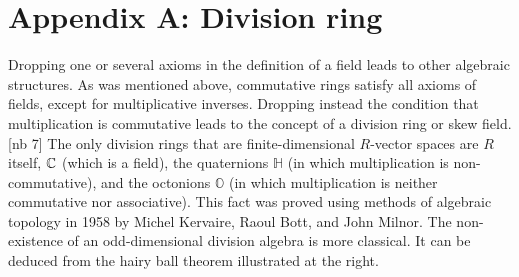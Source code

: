 
\chapter{Appendix A: Division ring}
\label{AppendixA}

Dropping one or several axioms in the definition of a field leads to other algebraic structures. As was mentioned above, commutative rings satisfy all axioms of fields, except for multiplicative inverses. Dropping instead the condition that multiplication is commutative leads to the concept of a division ring or skew field.[nb 7] The only division rings that are finite-dimensional \(R\)-vector spaces are \(R\) itself, \(\mathbb{C}\) (which is a field), the quaternions \(\mathbb{H}\) (in which multiplication is non-commutative), and the octonions \(\mathbb{O}\) (in which multiplication is neither commutative nor associative). This fact was proved using methods of algebraic topology in 1958 by Michel Kervaire, Raoul Bott, and John Milnor. The non-existence of an odd-dimensional division algebra is more classical. It can be deduced from the hairy ball theorem illustrated at the right.